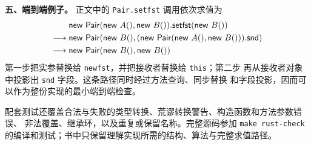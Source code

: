 \begin{taplsolutionentrybox}
\textbf{五、端到端例子。}
正文中的 \texttt{Pair.setfst} 调用依次求值为
\[
\begin{aligned}
 &\mathsf{new}\ \mathsf{Pair}(\mathsf{new}\ A(),\mathsf{new}\ B()).
   \mathsf{setfst}(\mathsf{new}\ B())\\
 \trans{}&\mathsf{new}\ \mathsf{Pair}
   (\mathsf{new}\ B(),
    (\mathsf{new}\ \mathsf{Pair}(\mathsf{new}\ A(),\mathsf{new}\ B())).\mathsf{snd})\\
 \trans{}&\mathsf{new}\ \mathsf{Pair}(\mathsf{new}\ B(),\mathsf{new}\ B())
\end{aligned}
\]
第一步把实参替换给 \texttt{newfst}，并把接收者替换给 \texttt{this}；第二步
再从接收者对象中投影出 \texttt{snd} 字段。这条路径同时经过方法查询、同步替换
和字段投影，因而可以作为整份实现的最小端到端检查。

配套测试还覆盖合法与失败的类型转换、荒谬转换警告、构造函数和方法参数错误、
非法覆盖、继承环，以及重复或保留名称。完整源码参加 \texttt{make rust-check}
的编译和测试；书中只保留理解实现所需的结构、算法与完整求值路径。

\end{taplsolutionentrybox}

